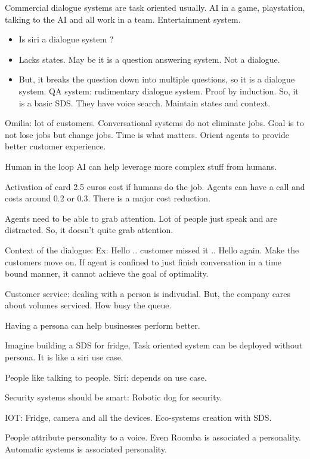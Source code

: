 \documentclass[12pt]{article}
\begin{document}
Commercial dialogue systems are task oriented usually. AI in a game, playstation, talking to the AI and all work in a team. Entertainment system.

\begin{itemize}
    \item Is siri a dialogue system ?
    \item Lacks states. May be it is a question answering system. Not a dialogue.
    \item But, it breaks the question down into multiple questions, so it is a dialogue system. QA system: rudimentary dialogue system. Proof by induction. So, it is a basic SDS. They have voice search. Maintain states and context.
\end{itemize}

Omilia: lot of customers. Conversational systems do not eliminate jobs. Goal is to not lose jobs but change jobs. Time is what matters. Orient agents to provide better customer experience.

Human in the loop AI can help leverage more complex stuff from humans.

Activation of card 2.5 euros cost if humans do the job. Agents can have a call and costs around 0.2 or 0.3. There is a major cost reduction.

Agents need to be able to grab attention. Lot of people just speak and are distracted. So, it doesn’t quite grab attention.

Context of the dialogue: Ex: Hello .. customer missed it .. Hello again. Make the customers move on.
If agent is confined to just finish conversation in a time bound manner, it cannot achieve the goal of optimality.

Customer service: dealing with a person is indivudial. But, the company cares about volumes serviced. How busy the queue.

Having a persona can help businesses perform better.

Imagine building a SDS for fridge, Task oriented system can be deployed without persona. It is like a siri use case.

People like talking to people. Siri: depends on use case.

Security systems should be smart: Robotic dog for security.

IOT: Fridge, camera and all the devices. Eco-systems creation with SDS.

People attribute personality to a voice. Even Roomba is associated a personality. Automatic systems is associated personality.
\end{document}
